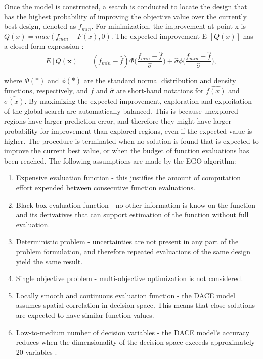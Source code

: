 \documentclass[10pt]{llncs}
\begin{document}
Once the model is constructed, a search is conducted to locate the design that has the highest probability of improving the objective value over the currently best design, denoted as $f_{min}$. For minimization, the improvement at point x is $Q(x)=max(f_{min} - F(x),0)$. The expected improvement E $[Q(x)]$ has a closed form expression \cite{Jones1998Efficient}: 
\begin{equation}\label{eq1}
	E[Q(\textbf{x})]=(f_{min}-\hat{f})\Phi\bigg(\frac{f_{min}-\hat{f}}{\hat{\sigma}}\bigg)+\hat{\sigma}\phi\bigg(\frac{f_{min}-\hat{f}}{\hat{\sigma}}\bigg),
\end{equation} 

where $\Phi{(*)}$ and $\phi{(*)}$ are the standard normal distribution and density functions,
respectively, and $\hat{f}$ and $\hat{\sigma}$ are short-hand notations for $\hat{f(x)}$ and $\hat{\sigma(x)}$.
By maximizing the expected improvement, exploration and exploitation of
the global search are automatically balanced. This is because unexplored regions
have larger prediction error, and therefore they might have larger probability for
improvement than explored regions, even if the expected value is higher. The
procedure is terminated when no solution is found that is expected to improve
the current best value, or when the budget of function evaluations has been
reached.
The following assumptions are made by the EGO algorithm:
\begin{enumerate}
	\item Expensive evaluation function - this justifies the amount of computation effort 			          expended between consecutive function evaluations.
	\item Black-box evaluation function - no other information is know on the function and its  	          derivatives that can support estimation of the function without full evaluation.
	\item Deterministic problem - uncertainties are not present in any part of the problem     	     	      formulation, and therefore repeated evaluations of the same design yield the same   		          result.
	\item Single objective problem - multi-objective optimization is not considered.
	\item Locally smooth and continuous evaluation function - the DACE model assumes spatial 			      correlation in decision-space. This means that close solutions are expected to have 			      similar function values.
	\item Low-to-medium number of decision variables - the DACE model's accuracy reduces when 	  		  the dimensionality of the decision-space exceeds approximately 20 variables \cite{Knowles200650}.	
\end{enumerate}
\end{document}
